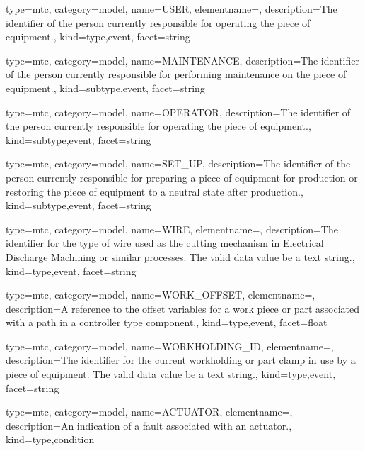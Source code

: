 {
  type=mtc,
  category=model,
  name={USER},
  elementname=,
  description={The identifier of the person currently responsible for operating the piece of equipment.},
  kind={type,event},
  facet={\gls{string}}
}


{
  type=mtc,
  category=model,
  name={MAINTENANCE},
  description={The identifier of the person currently responsible for performing maintenance on the piece of equipment.},
  kind={subtype,event},
  facet={\gls{string}}
}


{
  type=mtc,
  category=model,
  name={OPERATOR},
  description={The identifier of the person currently responsible for operating the piece of equipment.},
  kind={subtype,event},
  facet={\gls{string}}
}


{
  type=mtc,
  category=model,
  name={SET\_UP},
  description={The identifier of the person currently responsible for preparing a piece of equipment for production or restoring the piece of equipment to a neutral state after production.},
  kind={subtype,event},
  facet={\gls{string}}
}


{
  type=mtc,
  category=model,
  name={WIRE},
  elementname=,
  description={The identifier for the type of wire used as the cutting mechanism in Electrical Discharge Machining or similar processes. \newline The \gls{valid data value} \must be a text string.},
  kind={type,event},
  facet={\gls{string}}
}


{
  type=mtc,
  category=model,
  name={WORK\_OFFSET},
  elementname=,
  description={A reference to the offset variables for a work piece or part associated with a \gls{path} in a \gls{controller} type component.},
  kind={type,event},
  facet={\gls{float}}
}


{
  type=mtc,
  category=model,
  name={WORKHOLDING\_ID},
  elementname=,
  description={The identifier for the current workholding or part clamp in use by a piece of equipment. \newline The \gls{valid data value} \must be a text string.},
  kind={type,event},
  facet={\gls{string}}
}


{
  type=mtc,
  category=model,
  name={ACTUATOR},
  elementname=,
  description={An indication of a fault associated with an actuator.},
  kind={type,condition}
}


